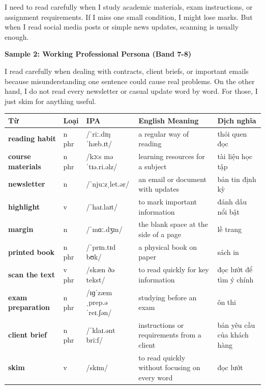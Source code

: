 I need to read carefully when I study academic materials, exam instructions, or assignment requirements. If I miss one small condition, I might lose marks. But when I read social media posts or simple news updates, scanning is usually enough.

\textbf{Sample 2: Working Professional Persona (Band 7-8)}

I read carefully when dealing with contracts, client briefs, or important emails because misunderstanding one sentence could cause real problems. On the other hand, I do not read every newsletter or casual update word by word. For those, I just skim for anything useful.

\separator


\vspace{0.8em}
\begin{center}
\renewcommand{\arraystretch}{1.65}
\begin{tabularx}{\textwidth}{|V{0.22\textwidth}|C{0.07\textwidth}|I{0.20\textwidth}|Y|V{0.18\textwidth}|}
\hline
{}
\textbf{Từ} & \textbf{Loại} & \textbf{IPA} & \textbf{English Meaning} & \textbf{Dịch nghĩa} \\
\hline
\textbf{reading habit} & n phr & /ˈriː.dɪŋ ˈhæb.ɪt/ & a regular way of reading & thói quen đọc \\ \hline
\textbf{course materials} & n phr & /kɔːs məˈtɪə.ri.əlz/ & learning resources for a subject & tài liệu học tập \\ \hline
\textbf{newsletter} & n & /ˈnjuːzˌlet.ər/ & an email or document with updates & bản tin định kỳ \\ \hline
\textbf{highlight} & v & /ˈhaɪ.laɪt/ & to mark important information & đánh dấu nổi bật \\ \hline
\textbf{margin} & n & /ˈmɑː.dʒɪn/ & the blank space at the side of a page & lề trang \\ \hline
\textbf{printed book} & n phr & /ˈprɪn.tɪd bʊk/ & a physical book on paper & sách in \\ \hline
\textbf{scan the text} & v phr & /skæn ðə tekst/ & to read quickly for key information & đọc lướt để tìm ý chính \\ \hline
\textbf{exam preparation} & n phr & /ɪɡˈzæm ˌprep.əˈreɪ.ʃən/ & studying before an exam & ôn thi \\ \hline
\textbf{client brief} & n phr & /ˈklaɪ.ənt briːf/ & instructions or requirements from a client & bản yêu cầu của khách hàng \\ \hline
\textbf{skim} & v & /skɪm/ & to read quickly without focusing on every word & đọc lướt \\ \hline
\end{tabularx}
\end{center}

